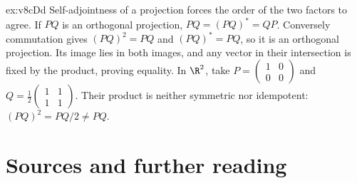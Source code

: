 \begin{solution}{ex:v8cDd}
\idea Self-adjointness of a projection forces the order of the two factors to agree.
\writeup If $PQ$ is an orthogonal projection, $PQ=(PQ)^*=QP$. Conversely commutation gives $(PQ)^2=PQ$ and $(PQ)^*=PQ$, so it is an orthogonal projection. Its image lies in both images, and any vector in their intersection is fixed by the product, proving equality. In $\R^2$, take $P=\begin{pmatrix}1&0\\0&0\end{pmatrix}$ and $Q=\tfrac12\begin{pmatrix}1&1\\1&1\end{pmatrix}$. Their product is neither symmetric nor idempotent: $(PQ)^2=PQ/2\ne PQ$.
\end{solution}

\section*{Sources and further reading}

